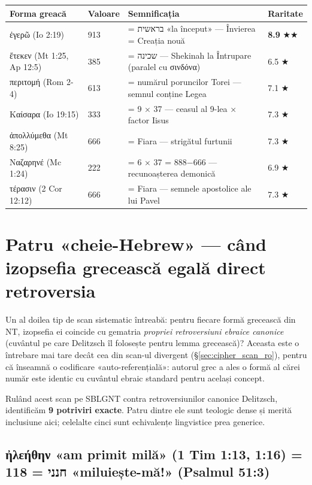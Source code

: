 \documentclass[12pt,a4paper,twoside,openany]{book}
\begin{document}
\begin{center}
\small
\begin{tabular}{L{3.5cm}L{1.4cm}L{7cm}L{2.5cm}}
\toprule
{}
\textbf{Forma greacă} & \textbf{Valoare} & \textbf{Semnificația} & \textbf{Raritate} \\
\midrule
ἐγερῶ (Io 2:19) & 913 & = בראשית «la început» — Învierea = Creația nouă & \textbf{8.9} ★★ \\
ἔτεκεν (Mt 1:25, Ap 12:5) & 385 & = שכינה — Shekinah la Întrupare (paralel cu σινδόνα) & 6.5 ★ \\
περιτομή (Rom 2-4) & 613 & = numărul poruncilor Torei — semnul conține Legea & 7.1 ★ \\
Καίσαρα (Io 19:15) & 333 & = 9 × 37 — ceasul al 9-lea × factor Iisus & 7.3 ★ \\
ἀπολλύμεθα (Mt 8:25) & 666 & = Fiara — strigătul furtunii & 7.3 ★ \\
Ναζαρηνέ (Mc 1:24) & 222 & = 6 × 37 = 888−666 — recunoașterea demonică & 6.9 ★ \\
τέρασιν (2 Cor 12:12) & 666 & = Fiara — semnele apostolice ale lui Pavel & 7.3 ★ \\
\bottomrule
\end{tabular}
\end{center}


\section{Patru «cheie-Hebrew» — când izopsefia grecească egală direct retroversia}
\label{sec:direct_retroversion_ro}

Un al doilea tip de scan sistematic întreabă: pentru fiecare formă grecească din NT, izopsefia ei coincide cu gematria \textit{propriei retroversiuni ebraice canonice} (cuvântul pe care Delitzsch îl folosește pentru lemma grecească)? Aceasta este o întrebare mai tare decât cea din scan-ul divergent (\S\ref{sec:cipher_scan_ro}), pentru că înseamnă o codificare «auto-referențială»: autorul grec a ales o formă al cărei număr este identic cu cuvântul ebraic standard pentru același concept.

Rulând acest scan pe SBLGNT contra retroversiunilor canonice Delitzsch, identificăm \textbf{9 potriviri exacte}. Patru dintre ele sunt teologic dense și merită inclusiune aici; celelalte cinci sunt echivalențe lingvistice prea generice.

\subsection{ἠλεήθην «am primit milă» (1 Tim 1:13, 1:16) = 118 = חנני «miluiește-mă!» (Psalmul 51:3)}
\end{document}
